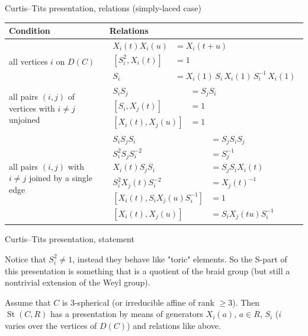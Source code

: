 \documentclass{beamer} %
\DeclareMathOperator{\St}{St}
\theoremstyle{definition}
\begin{document}
\begin{frame}{Curtis--Tits presentation, relations (simply-laced case)}
\renewcommand{\arraystretch}{1.4}

\begin{tabular}{p{} p{}}

\textbf{Condition} & \textbf{Relations} \\ \hline

all vertices $i$ on $D(C)$ &
\scriptsize{$\begin{aligned}
X_i(t)X_i(u) &= X_i(t+u) \\
[S_i^2, X_i(t)] &= 1 \\
S_i &= X_i(1)\, S_i\, X_i(1)\, S_i^{-1}\, X_i(1)
\end{aligned}$} \\
\hline
\pause
all pairs $(i,j)$ of vertices with $i \neq j$ unjoined &
\scriptsize{$\begin{aligned}
S_i S_j &= S_j S_i \\
[S_i, X_j(t)] &= 1 \\
[X_i(t), X_j(u)] &= 1
\end{aligned}$} \\
\hline
\pause
all pairs $(i,j)$ with $i \neq j$ joined by a single edge &
\scriptsize{
$\begin{aligned}
S_i S_j S_i &= S_j S_i S_j \\
S_i^2 S_j S_i^{-2} &= S_j^{-1} \\
X_i(t) S_j S_i &= S_j S_i X_i(t) \\
S_i^2 X_j(t) S_i^{-2} &= X_j(t)^{-1} \\
[X_i(t), S_i X_j(u) S_i^{-1}] &= 1 \\
[X_i(t), X_j(u)] &= S_i X_j(tu) S_i^{-1}
\end{aligned}$} \\

\end{tabular}
\end{frame}

\begin{frame}{Curtis--Tits presentation, statement}

Notice that $S_i^2 \neq 1$, instead they behave like "toric" elements. So the S-part of this presentation is something that is a quotient of the braid group (but still a nontrivial extension of the Weyl group).

\pause \begin{theorem}[Allcock, 2016]
 Assume that $C$ is $3$-spherical (or irreducible affine of rank $\geq 3$). Then $\St(C, R)$ has a presentation by means of generators $X_i(a)$, $a \in R$, $S_i$ ($i$ varies over the vertices of $D(C)$) and relations like above.
\end{theorem}
\end{frame}
\end{document}
